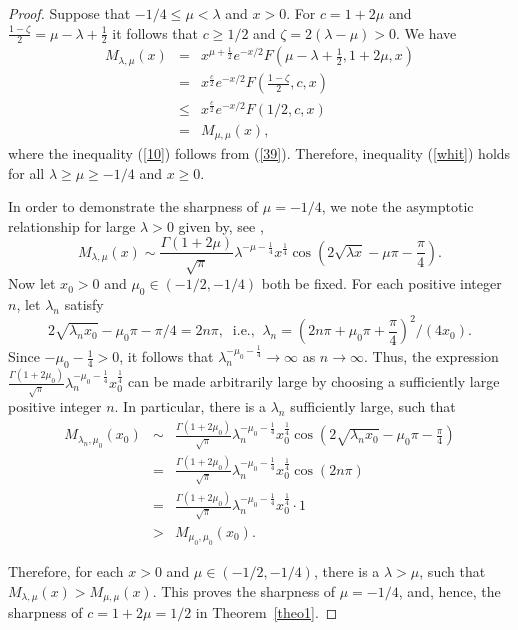 \begin{proof} Suppose that $-1/4\leq\mu<\lambda$ and $x>0$.  For
$c=1+2\mu$ and $\frac{1-\zeta}{2}=\mu-\lambda+\frac{1}{2}$ it follows
that $c\geq 1/2$ and $\zeta=2(\lambda-\mu)>0$. We have
\begin{eqnarray}
\nonumber
M_{\lambda,\mu}(x) & = & x^{\mu+\frac{1}{2}} e^{-x/2} F
\left(\mu-\lambda+\frac{1}{2},1+2\mu,x\right) \\[1ex]
\nonumber
& = & x^{\frac{c}{2}} e^{-x/2} F
\left(\frac{1-\zeta}{2},c,x\right) \\[1ex]
\label{10}
& \leq & x^{\frac{c}{2}} e^{-x/2} F (1/2,c,x)\\[1ex]
\nonumber
& = & M_{\mu,\mu}(x),
\end{eqnarray}
where the inequality (\ref{10}) follows from (\ref{39}). Therefore,
inequality (\ref{whit}) holds for all $\lambda\geq\mu\geq-1/4$ and $x\geq 0$.

In order to demonstrate the sharpness of $\mu=-1/4$, we note the
asymptotic relationship for large $\lambda>0$ given by, see
\cite[p. 1089, \#9.228]{GR},
\[
M_{\lambda,\mu}(x)\sim\frac{\Gamma(1+2\mu)}{\sqrt{\pi}}
\lambda^{-\mu-\frac{1}{4}}x^{\frac{1}{4}}
\cos(2\sqrt{\lambda x}-\mu\pi-\frac{\pi}{4}).
\]
Now let $x_0>0$ and $\mu_0\in(-1/2,-1/4)$ both be fixed.
For each positive integer $n$, let $\lambda_n$ satisfy
$$
2\sqrt{\lambda_nx_0}-\mu_0\pi-\pi/4=2n\pi,\;\; \mbox{i.e.,}\;\;
\lambda_n=(2n\pi+\mu_0\pi+\frac{\pi}{4})^2/(4x_0).
$$
Since $-\mu_0-\frac{1}{4}>0$, it follows that
$\lambda_n^{-\mu_0-\frac{1}{4}}\rightarrow \infty$ as
$n\rightarrow \infty$. Thus, the expression
$\frac{\Gamma(1+2\mu_0)}{\sqrt{\pi}}\lambda_n^{-\mu_0-\frac{1}{4}}
x_0^{\frac{1}{4}}$ can be made arbitrarily large by choosing a
sufficiently large positive integer $n$. In particular, there is a
$\lambda_n$ sufficiently large, such that
\begin{eqnarray*}
M_{\lambda_n,\mu_0}(x_0) & \sim & \frac{\Gamma(1+2\mu_0)}
{\sqrt{\pi}}\lambda_n^{-\mu_0-\frac{1}{4}}x_0^{\frac{1}{4}}\cos
\left(2\sqrt{\lambda_nx_0}-\mu_0\pi-\frac{\pi}{4}\right)\\[1ex]
& = & \frac{\Gamma(1+2\mu_0)}{\sqrt{\pi}}\lambda_n^{-\mu_0-\frac{1}
{4}}x_0^{\frac{1}{4}}\cos(2n\pi)\\[1ex]
& = & \frac{\Gamma(1+2\mu_0)}{\sqrt{\pi}}\lambda_n^{-\mu_0-\frac{1}
{4}}x_0^{\frac{1}{4}}\cdot 1\\[1ex]
& > & M_{\mu_0,\mu_0}(x_0).
\end{eqnarray*}

Therefore, for each $x>0$ and $\mu\in(-1/2,-1/4)$, there is a
$\lambda>\mu$, such that $M_{\lambda,\mu}(x)>M_{\mu,\mu}(x)$.  This
proves the sharpness of $\mu=-1/4$, and, hence, the sharpness of
$c=1+2\mu=1/2$ in Theorem~\ref{theo1}.
\end{proof}


